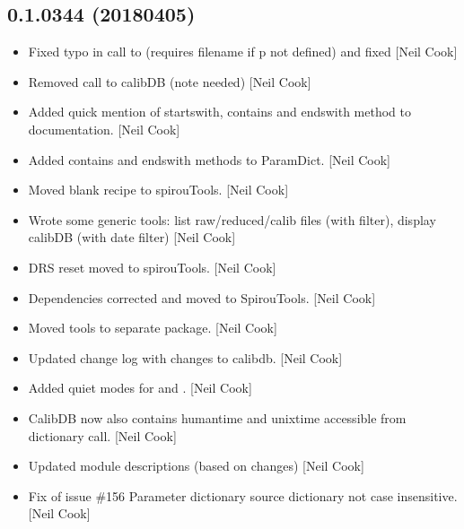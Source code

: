 \documentclass[a4paper,10pt,english]{report}
\begin{document}
\subsection{0.1.0344 (2018\sphinxhyphen{}04\sphinxhyphen{}05)}
\label{\detokenize{misc/changelog:id486}}\begin{itemize}
\item {} 
Fixed typo in call to  (requires filename if p not
defined) and fixed  {[}Neil Cook{]}

\item {} 
Removed call to calibDB (note needed) {[}Neil Cook{]}

\item {} 
Added quick mention of startswith, contains and endswith method to
documentation. {[}Neil Cook{]}

\item {} 
Added contains and endswith methods to ParamDict. {[}Neil Cook{]}

\item {} 
Moved blank recipe to spirouTools. {[}Neil Cook{]}

\item {} 
Wrote some generic tools: list raw/reduced/calib files (with filter),
display calibDB (with date filter) {[}Neil Cook{]}

\item {} 
DRS reset moved to spirouTools. {[}Neil Cook{]}

\item {} 
Dependencies corrected and moved to SpirouTools. {[}Neil Cook{]}

\item {} 
Moved tools to separate package. {[}Neil Cook{]}

\item {} 
Updated change log with changes to calibdb. {[}Neil Cook{]}

\item {} 
Added quiet modes for  and . {[}Neil Cook{]}

\item {} 
CalibDB now also contains humantime and unixtime accessible from
dictionary call. {[}Neil Cook{]}

\item {} 
Updated module descriptions (based on changes) {[}Neil Cook{]}

\item {} 
Fix of issue \#156 \sphinxhyphen{} Parameter dictionary source dictionary not case
insensitive. {[}Neil Cook{]}


\end{itemize}
\end{document}
